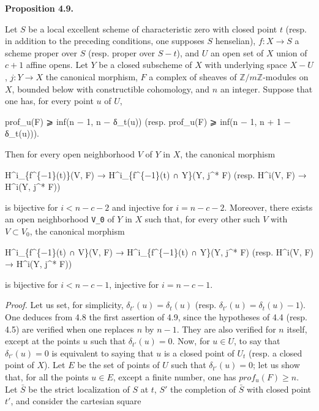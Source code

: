 \documentclass[
  11pt,
  a4paper,
]{book}
\newenvironment{Shaded}{}{}
\newcommand{\NormalTok}[1]{#1}
\begin{document}
\textbf{Proposition 4.9.}

Let \(S\) be a local excellent scheme of characteristic zero with closed
point \(t\) (resp. in addition to the preceding conditions, one supposes
\(S\) henselian), \(f : X \to S\) a scheme proper over \(S\) (resp.
proper over \(S - {t}\)), and \(U\) an open set of \(X\) union of
\(c + 1\) affine opens. Let \(Y\) be a closed subscheme of \(X\) with
underlying space \(X - U\), \(j : Y \to X\) the canonical morphism,
\(F\) a complex of sheaves of \(\mathbb{Z}/m\mathbb{Z}\)-modules on
\(X\), bounded below with constructible cohomology, and \(n\) an
integer. Suppose that one has, for every point \(u\) of \(U\),

\begin{Shaded}
\begin{Highlighting}[]
\NormalTok{prof\_u(F) ⩾ inf(n − 1, n − δ\_t(u))  (resp. prof\_u(F) ⩾ inf(n − 1, n + 1 − δ\_t(u))).}
\end{Highlighting}
\end{Shaded}

Then for every open neighborhood \(V\) of \(Y\) in \(X\), the canonical
morphism

\begin{Shaded}
\begin{Highlighting}[]
\NormalTok{H\^{}i\_\{f\^{}\{−1\}(t)\}(V, F) → H\^{}i\_\{f\^{}\{−1\}(t) ∩ Y\}(Y, j\^{}* F)   (resp. H\^{}i(V, F) → H\^{}i(Y, j\^{}* F))}
\end{Highlighting}
\end{Shaded}

is bijective for \(i < n - c - 2\) and injective for \(i = n - c - 2\).
Moreover, there exists an open neighborhood \texttt{V\_0} of \(Y\) in
\(X\) such that, for every other such \(V\) with \(V \subset V_{0}\),
the canonical morphism

\begin{Shaded}
\begin{Highlighting}[]
\NormalTok{H\^{}i\_\{f\^{}\{−1\}(t) ∩ V\}(V, F) → H\^{}i\_\{f\^{}\{−1\}(t) ∩ Y\}(Y, j\^{}* F)   (resp. H\^{}i(V, F) → H\^{}i(Y, j\^{}* F))}
\end{Highlighting}
\end{Shaded}

is bijective for \(i < n - c - 1\), injective for \(i = n - c - 1\).

\emph{Proof.} Let us set, for simplicity,
\(\delta_{t'}(u) = \delta_{t}(u)\) (resp.
\(\delta_{t'}(u) = \delta_{t}(u) - 1\)). One deduces from 4.8 the first
assertion of 4.9, since the hypotheses of 4.4 (resp. 4.5) are verified
when one replaces \(n\) by \(n - 1\). They are also verified for \(n\)
itself, except at the points \(u\) such that \(\delta_{t'}(u) = 0\).
Now, for \(u
\in U\), to say that \(\delta_{t'}(u) = 0\) is equivalent to saying that
\(u\) is a closed point of \(U_{t}\) (resp. a closed point of \(X\)).
Let \(E\) be the set of points of \(U\) such that
\(\delta_{t'}(u) = 0\); let us show that, for all the points
\(u \in E\), except a finite number, one has
\(prof_{u}(F) \geqslant n\). Let \(\bar{S}\) be the strict localization
of \(S\) at \(t\), \(S'\) the completion of \(\bar{S}\) with closed
point \(t'\), and consider the cartesian square
\end{document}
